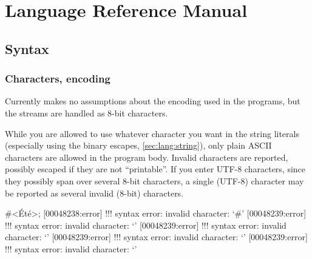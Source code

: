 
\newcommand{\forAnd}{\texorpdfstring{\lstinline{for&}}{for\&}}

\chapter{\us Language Reference Manual}
\label{sec:lang}

\section{Syntax}

\subsection{Characters, encoding}

Currently \us makes no assumptions about the encoding used in the
programs, but the streams are handled as 8-bit characters.

While you are allowed to use whatever character you want in the string
literals (especially using the binary escapes,
\autoref{sec:lang:string}), only plain ASCII characters are
allowed in the program body.  Invalid characters are reported,
possibly escaped if they are not ``printable''.  If you enter UTF-8
characters, since they possibly span over several 8-bit characters, a
single (UTF-8) character may be reported as several invalid (8-bit)
characters.

\begin{urbiscript}[firstnumber=1,escapeinside=<>]
#<Été>;
[00048238:error] !!! syntax error: invalid character: `#'
[00048239:error] !!! syntax error: invalid character: `'
[00048239:error] !!! syntax error: invalid character: `'
[00048239:error] !!! syntax error: invalid character: `'
[00048239:error] !!! syntax error: invalid character: `'
\end{urbiscript}

